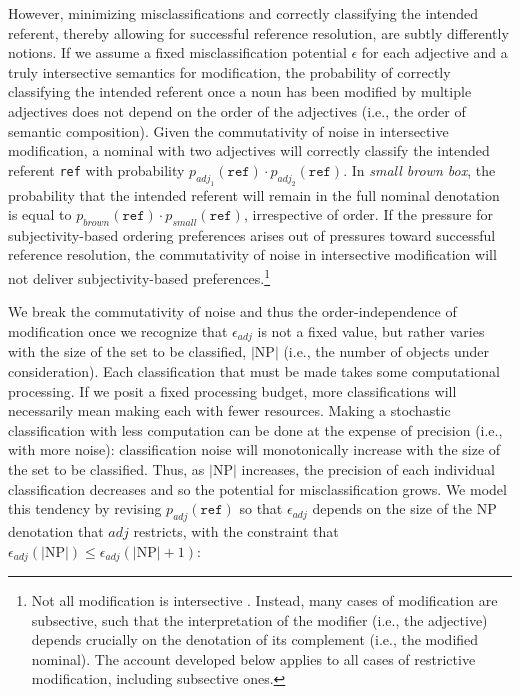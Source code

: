 \documentclass{sp}
\begin{document}
However, minimizing misclassifications and correctly classifying the intended referent, thereby allowing for successful reference resolution, are subtly differently notions. If we assume a fixed misclassification potential $\epsilon$ for each adjective and a truly intersective semantics for modification, the probability of correctly classifying the intended referent once a noun has been modified by multiple adjectives does not depend on the order of the adjectives (i.e., the order of semantic composition). 
Given the commutativity of noise in intersective modification, a nominal with two adjectives will correctly classify the intended referent \texttt{ref} with probability $p_{adj_1}(\texttt{ref}) \cdot p_{adj_2}(\texttt{ref})$. In \emph{small brown box}, the probability that the intended referent will remain in the full nominal denotation is equal to $p_{brown}(\texttt{ref}) \cdot p_{small}(\texttt{ref})$, irrespective of order. If the pressure for subjectivity-based ordering preferences 
arises out of pressures toward successful reference resolution, the commutativity of noise in intersective modification will not deliver subjectivity-based preferences.\footnote{Not all modification is intersective \citep{kamppartee1995}.  
Instead, many cases of modification are subsective, such that the interpretation of the modifier (i.e., the adjective) depends crucially on the denotation of its complement (i.e., the modified nominal). The account developed below applies to all cases of restrictive modification, including subsective ones.}


We break the commutativity of noise and thus the order-independence of modification once we recognize that $\epsilon_{adj}$ is not a fixed value, but rather varies with the size of the set to be classified, $|\textrm{NP}|$ (i.e., the number of objects under consideration). Each classification that must be made takes some computational processing. If we posit a fixed processing budget, more classifications will necessarily mean making each with fewer resources. Making a stochastic classification with less computation can be done at the expense of precision (i.e., with more noise): classification noise will monotonically increase with the size of the set to be classified. 
Thus, as $|\textrm{NP}|$ increases, the precision of each individual classification decreases and so the potential for misclassification grows. We model this tendency by revising $p_{adj}(\texttt{ref})$ so that $\epsilon_{adj}$ depends on the size of the NP denotation that $adj$ restricts, with the constraint that $\epsilon_{adj}(|\textrm{NP}|) \leq \epsilon_{adj}(|\textrm{NP}|+1)$:
\end{document}
